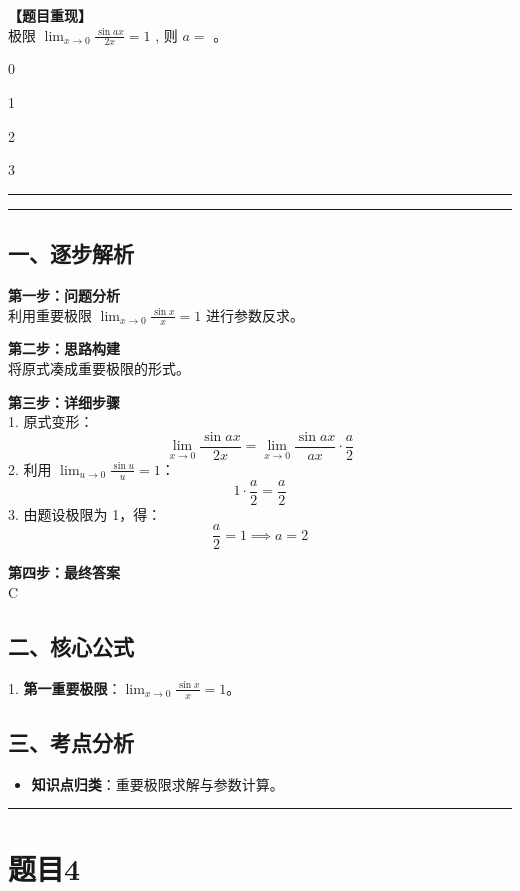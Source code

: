 \documentclass[12pt, a4paper]{ctexart}
\newcommand{\TopSeparator}{
    \par\noindent\rule{\textwidth}{1.5pt}\vspace{0.5em} %
}
\newcommand{\AnalysisSeparator}{
    \par\noindent\rule{\textwidth}{0.5pt}\vspace{0.2em}\hrule\vspace{0.5em} %
}
\newenvironment{RedAnalysis}{
    \par
    \color{red} %
}{
    \par
    \color{black} %
}
\newcommand{\choicesFour}[4]{
    \begin{enumerate}[label=\Alph*., itemsep=0pt, parsep=0pt, topsep=5pt, labelsep=0.5em]
        \begin{minipage}{0.22\linewidth} \item #1 \end{minipage}
        \begin{minipage}{0.22\linewidth} \item #2 \end{minipage}
        \begin{minipage}{0.22\linewidth} \item #3 \end{minipage}
        \begin{minipage}{0.22\linewidth} \item #4 \end{minipage}
    \end{enumerate}
}
\begin{document}
\textbf{【题目重现】} \\
极限 $ \lim_{x\to0}\frac{\sin ax}{2x}=1 $ , 则 $a=$ \underline{\hspace{1cm}}。
\choicesFour{0}{1}{2}{3}

\AnalysisSeparator

\begin{RedAnalysis}

\subsection*{一、逐步解析}

\textbf{第一步：问题分析} \\
利用重要极限 $\lim_{x\to 0} \frac{\sin x}{x} = 1$ 进行参数反求。

\textbf{第二步：思路构建} \\
将原式凑成重要极限的形式。

\textbf{第三步：详细步骤} \\
1. 原式变形：
   \[ \lim_{x\to 0} \frac{\sin ax}{2x} = \lim_{x\to 0} \frac{\sin ax}{ax} \cdot \frac{a}{2} \]
2. 利用 $\lim_{u\to 0} \frac{\sin u}{u} = 1$：
   \[ 1 \cdot \frac{a}{2} = \frac{a}{2} \]
3. 由题设极限为 1，得：
   \[ \frac{a}{2} = 1 \implies a = 2 \]

\textbf{第四步：最终答案} \\
C

\subsection*{二、核心公式}
1. \textbf{第一重要极限}：$\lim_{x\to 0} \frac{\sin x}{x} = 1$。

\subsection*{三、考点分析}
\begin{itemize}
    \item \textbf{知识点归类}：重要极限求解与参数计算。
\end{itemize}

\end{RedAnalysis}

\vspace{2em}

\TopSeparator
\section*{题目4}
\end{document}
